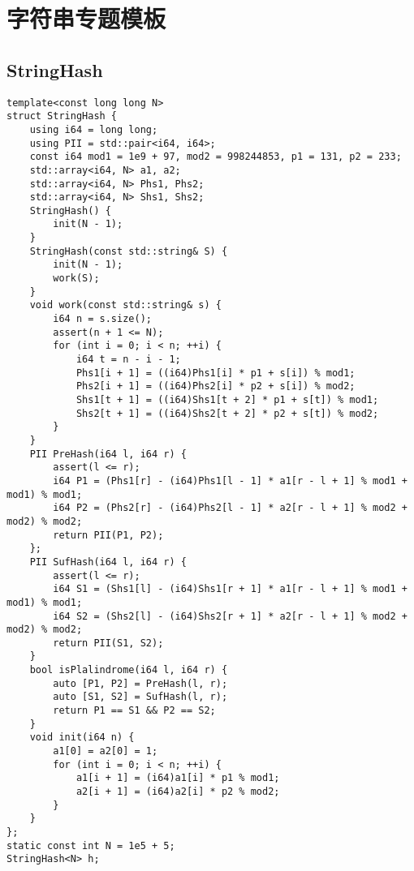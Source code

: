 \section{字符串专题模板}
\subsection{StringHash}
\begin{lstlisting}
template<const long long N>
struct StringHash {
    using i64 = long long;
    using PII = std::pair<i64, i64>;
    const i64 mod1 = 1e9 + 97, mod2 = 998244853, p1 = 131, p2 = 233;
    std::array<i64, N> a1, a2;
    std::array<i64, N> Phs1, Phs2;
    std::array<i64, N> Shs1, Shs2;
    StringHash() {
        init(N - 1);
    }
    StringHash(const std::string& S) {
        init(N - 1);
        work(S);
    }
    void work(const std::string& s) {  
        i64 n = s.size();
        assert(n + 1 <= N);
        for (int i = 0; i < n; ++i) {
            i64 t = n - i - 1;
            Phs1[i + 1] = ((i64)Phs1[i] * p1 + s[i]) % mod1;
            Phs2[i + 1] = ((i64)Phs2[i] * p2 + s[i]) % mod2;
            Shs1[t + 1] = ((i64)Shs1[t + 2] * p1 + s[t]) % mod1;
            Shs2[t + 1] = ((i64)Shs2[t + 2] * p2 + s[t]) % mod2;
        }
    }
    PII PreHash(i64 l, i64 r) {
        assert(l <= r);
        i64 P1 = (Phs1[r] - (i64)Phs1[l - 1] * a1[r - l + 1] % mod1 + mod1) % mod1;
        i64 P2 = (Phs2[r] - (i64)Phs2[l - 1] * a2[r - l + 1] % mod2 + mod2) % mod2;
        return PII(P1, P2);
    };
    PII SufHash(i64 l, i64 r) {
        assert(l <= r);
        i64 S1 = (Shs1[l] - (i64)Shs1[r + 1] * a1[r - l + 1] % mod1 + mod1) % mod1;
        i64 S2 = (Shs2[l] - (i64)Shs2[r + 1] * a2[r - l + 1] % mod2 + mod2) % mod2;
        return PII(S1, S2);
    }
    bool isPlalindrome(i64 l, i64 r) {
        auto [P1, P2] = PreHash(l, r);
        auto [S1, S2] = SufHash(l, r);
        return P1 == S1 && P2 == S2;
    }
    void init(i64 n) {
        a1[0] = a2[0] = 1;
        for (int i = 0; i < n; ++i) {
            a1[i + 1] = (i64)a1[i] * p1 % mod1;
            a2[i + 1] = (i64)a2[i] * p2 % mod2;
        }
    }
};
static const int N = 1e5 + 5;
StringHash<N> h;
\end{lstlisting}

